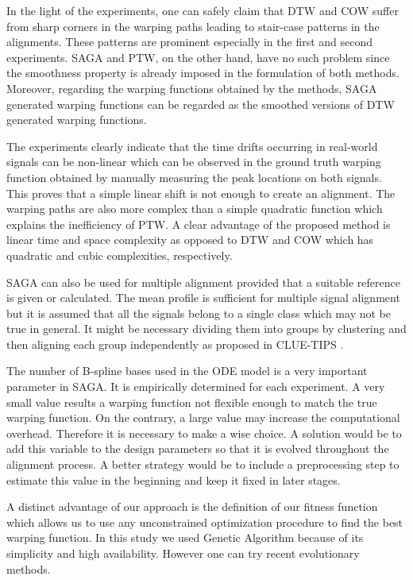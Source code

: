 \documentclass[number,1p,12pt]{elsarticle}
\begin{document}
In the light of the experiments, one can safely claim that DTW and COW suffer from sharp corners in the warping paths leading to stair-case patterns in the alignments. These patterns are prominent especially in the first and second experiments. SAGA and PTW, on the other hand, have no such problem since the smoothness property is already imposed in the formulation of both methods. Moreover, regarding the warping functions obtained by the methods, SAGA generated warping functions can be regarded as the smoothed versions of DTW generated warping functions.

The experiments clearly indicate that the time drifts occurring in real-world signals can be non-linear which can be observed in the ground truth warping function obtained by manually measuring the peak locations on both signals. This proves that a simple linear shift is not enough to create an alignment. The warping paths are also more complex than a simple quadratic function which explains the inefficiency of PTW. A clear advantage of the proposed method is linear time and space complexity as opposed to DTW and COW which has quadratic and cubic complexities, respectively.

SAGA can also be used for multiple alignment provided that a suitable reference is given or calculated. The mean profile is sufficient for multiple signal alignment but it is assumed that all the signals belong to a single class which may not be true in general. It might be necessary dividing them into groups by clustering and then aligning each group independently as proposed in CLUE-TIPS \cite{Akella2009}.

The number of B-spline bases used in the ODE model is a very important parameter in SAGA. It is empirically determined for each experiment. A very small value results a warping function not flexible enough to match the true warping function. On the contrary, a large value may increase the computational overhead. Therefore it is necessary to make a wise choice. A solution would be to add this variable to the design parameters so that it is evolved throughout the alignment process. A better strategy would be to include a preprocessing step to estimate this value in the beginning and keep it fixed in later stages.

A distinct advantage of our approach is the definition of our fitness function which allows us to use any unconstrained optimization procedure to find the best warping function. In this study we used Genetic Algorithm because of its simplicity and high availability. However one can try recent evolutionary methods.
\end{document}
